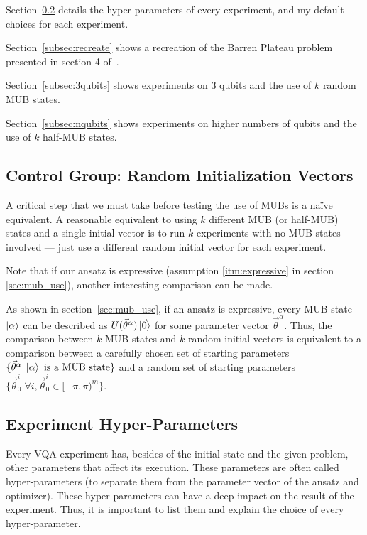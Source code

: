 \documentclass[a4paper,12pt]{article}
\newcommand{\thetas}{\vec{\theta}}
\begin{document}
Section~\ref{subsec:hyperparams} details the hyper-parameters of every experiment, and my default choices for each experiment.

Section~\ref{subsec:recreate} shows a recreation of the Barren Plateau problem presented in section 4 of~\cite{arrasmith_effect_2021}.

Section~\ref{subsec:3qubits} shows experiments on 3 qubits and the use of $k$ random MUB states.

Section~\ref{subsec:nqubits} shows experiments on higher numbers of qubits and the use of $k$ half-MUB states.

\subsection{Control Group: Random Initialization Vectors} \label{subsec:random_thetas}
A critical step that we must take before testing the use of MUBs is a na{\"i}ve equivalent.
A reasonable equivalent to using $k$ different MUB (or half-MUB) states and a single initial vector is to run $k$ experiments with no MUB states involved --- just use a different random initial vector for each experiment.

Note that if our ansatz is expressive (assumption \ref{itm:expressive} in section \ref{sec:mub_use}), another interesting comparison can be made.

As shown in section~\ref{sec:mub_use}, if an ansatz is expressive, every MUB state $\ket{\alpha}$ can be described as $U(\thetas^\alpha)\ket{\vec{0}}$ for some parameter vector $\thetas^\alpha$.
Thus, the comparison between $k$ MUB states and $k$ random initial vectors is equivalent to a comparison between a carefully chosen set of starting parameters $\{\thetas^{\alpha} | \ket{\alpha} \textrm{ is a MUB state}\}$ and a random set of starting parameters $\{\thetas_0^i | \forall i, \thetas_{0}^{i} \in [-\pi, \pi)^m\}$.

\subsection{Experiment Hyper-Parameters} \label{subsec:hyperparams}
Every VQA experiment has, besides of the initial state and the given problem, other parameters that affect its execution.
These parameters are often called hyper-parameters (to separate them from the parameter vector of the ansatz and optimizer).
These hyper-parameters can have a deep impact on the result of the experiment.
Thus, it is important to list them and explain the choice of every hyper-parameter.
\end{document}

